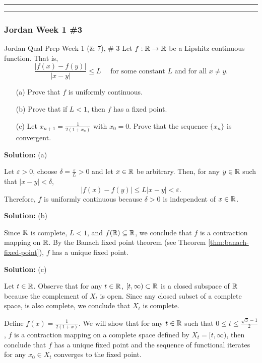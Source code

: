 \documentclass{article}
\begin{document}
\hrule \vspace{2pt}
\hrule 

\break 

\subsubsection{Jordan Week 1 \#3}

\begin{problem}{Jordan Qual Prep Week 1 (\& 7), \# 3} Let $f:\mathbb R \to \mathbb R$ be a Lipshitz continuous function. That is, 
	\[\frac{ |f(x)- f(y)| }{|x-y|} \leq L \quad \text{ for some constant $L$ and for all $x\neq y$.}\]
	\begin{enumerate}
		\item[(a)] Prove that $f$ is uniformly continuous.
		\item[(b)] Prove that if $L<1$, then $f$ has a fixed point. 
		\item[(c)] Let $x_{n+1} = \frac{ 1 }{2( 1+ x_n)}$ with $x_0= 0$. Prove that the sequence $\{x_n\}$ is convergent.
	\end{enumerate}
\end{problem}

\textbf{Solution:} (a)

Let $\varepsilon > 0$, choose $\delta = \frac{\varepsilon}{L}>0$ and let $x\in\mathbb R$ be arbitrary. Then, for any $y\in \mathbb R$ such that $|x-y|<\delta$,
	\[ |f(x) - f(y)| \leq L|x-y| < \varepsilon.\]
Therefore, $f$ is uniformly continuous because $\delta>0$ is independent of $x\in\mathbb R$. 

\textbf{Solution:} (b)

Since $\mathbb R$ is complete, $L<1$, and $f(\mathbb R)\subseteq \mathbb R$, we conclude that $f$ is a contraction mapping on $\mathbb R$. By the Banach fixed point theorem (see Theorem \ref{thm:banach-fixed-point}), $f$ has a unique fixed point.

\textbf{Solution:} (c)

Let $t\in\mathbb R$. Observe that for any $t\in \mathbb R$, $[t,\infty)\subset \mathbb R$ is a closed subspace of $\mathbb R$ because the complement of $X_t$ is open. Since any closed subset of a complete space, is also complete, we conclude that $X_t$ is complete. 

Define $f(x) = \frac{1}{2(1+x)}$. We will show that for any $t\in \mathbb R$ such that $0 \leq t \leq \frac{\sqrt{3} - 1}{2}$, $f$ is a contraction mapping on a complete space defined by $X_t = [t, \infty)$, then conclude that $f$ has a unique fixed point and the sequence of functional iterates for any $x_0\in X_t$ converges to the fixed point. 
\end{document}
